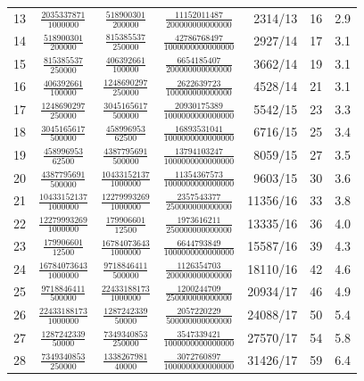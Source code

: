 \documentclass[11pt]{amsart}
\theoremstyle{definition}
\theoremstyle{remark}
\numberwithin{equation}{section}
\begin{document}
\begin{longtable}{@{}rccc rrr@{}}
13 & $\tfrac{2035337871}{1000000}$ & $\tfrac{518900301}{200000}$ & $\tfrac{11152011487}{200000000000000}$ & 2314/13 & 16 & 2.9 \\
14 & $\tfrac{518900301}{200000}$ & $\tfrac{815385537}{250000}$ & $\tfrac{42786768497}{1000000000000000}$ & 2927/14 & 17 & 3.1 \\
15 & $\tfrac{815385537}{250000}$ & $\tfrac{406392661}{100000}$ & $\tfrac{6654185407}{200000000000000}$ & 3662/14 & 19 & 3.1 \\
16 & $\tfrac{406392661}{100000}$ & $\tfrac{1248690297}{250000}$ & $\tfrac{2622639723}{100000000000000}$ & 4528/14 & 21 & 3.1 \\
17 & $\tfrac{1248690297}{250000}$ & $\tfrac{3045165617}{500000}$ & $\tfrac{20930175389}{1000000000000000}$ & 5542/15 & 23 & 3.3 \\
18 & $\tfrac{3045165617}{500000}$ & $\tfrac{458996953}{62500}$ & $\tfrac{16893531041}{1000000000000000}$ & 6716/15 & 25 & 3.4 \\
19 & $\tfrac{458996953}{62500}$ & $\tfrac{4387795691}{500000}$ & $\tfrac{13794103247}{1000000000000000}$ & 8059/15 & 27 & 3.5 \\
20 & $\tfrac{4387795691}{500000}$ & $\tfrac{10433152137}{1000000}$ & $\tfrac{11354367573}{1000000000000000}$ & 9603/15 & 30 & 3.6 \\
21 & $\tfrac{10433152137}{1000000}$ & $\tfrac{12279993269}{1000000}$ & $\tfrac{2357543377}{250000000000000}$ & 11356/16 & 33 & 3.8 \\
22 & $\tfrac{12279993269}{1000000}$ & $\tfrac{179906601}{12500}$ & $\tfrac{1973616211}{250000000000000}$ & 13335/16 & 36 & 4.0 \\
23 & $\tfrac{179906601}{12500}$ & $\tfrac{16784073643}{1000000}$ & $\tfrac{6644793849}{1000000000000000}$ & 15587/16 & 39 & 4.3 \\
24 & $\tfrac{16784073643}{1000000}$ & $\tfrac{9718846411}{500000}$ & $\tfrac{1126354703}{200000000000000}$ & 18110/16 & 42 & 4.6 \\
25 & $\tfrac{9718846411}{500000}$ & $\tfrac{22433188173}{1000000}$ & $\tfrac{1200244709}{250000000000000}$ & 20934/17 & 46 & 4.9 \\
26 & $\tfrac{22433188173}{1000000}$ & $\tfrac{1287242339}{50000}$ & $\tfrac{2057220229}{500000000000000}$ & 24088/17 & 50 & 5.4 \\
27 & $\tfrac{1287242339}{50000}$ & $\tfrac{7349340853}{250000}$ & $\tfrac{3547339421}{1000000000000000}$ & 27570/17 & 54 & 5.8 \\
28 & $\tfrac{7349340853}{250000}$ & $\tfrac{1338267981}{40000}$ & $\tfrac{3072760897}{1000000000000000}$ & 31426/17 & 59 & 6.4 \\

\end{longtable}
\end{document}
